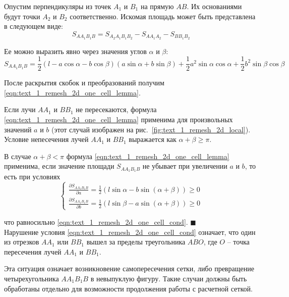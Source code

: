 Опустим перпендикуляры из точек $A_1$ и $B_1$ на прямую $AB$.
Их основаниями будут точки $A_2$ и $B_2$ соответственно.
Искомая площадь может быть представлена в следующем виде:
\begin{equation}
S_{AA_1B_1B} = S_{A_2A_1B_1B_2} - S_{AA_1A_2} - S_{BB_1B_2}
\end{equation}

Ее можно выразить явно через значения углов $\alpha$ и $\beta$:
\begin{equation}
S_{AA_1B_1B} = \frac{1}{2}(l - a \cos \alpha - b \cos \beta)(a \sin \alpha + b \sin \beta) + \frac{1}{2}a^2 \sin \alpha \cos \alpha + \frac{1}{2}b^2 \sin \beta \cos \beta
\end{equation}

После раскрытия скобок и преобразований получим \eqref{eqn:text_1_remesh_2d_one_cell_lemma}.

Если лучи $AA_1$ и $BB_1$ не пересекаются, формула \eqref{eqn:text_1_remesh_2d_one_cell_lemma} применима для произвольных значений $a$ и $b$ (этот случай изображен на рис.~\ref{fig:text_1_remesh_2d_local}).
Условие непесечения лучей $AA_1$ и $BB_1$ выражается как $\alpha + \beta \ge \pi$.

В случае $\alpha + \beta < \pi$ формула \eqref{eqn:text_1_remesh_2d_one_cell_lemma} применима, если значение площади $S_{AA_1B_1B}$ не убывает при увеличении $a$ и $b$, то есть при условиях
\begin{equation}
	\begin{cases}
		\frac{\partial S_{AA_1B_1B}}{\partial a} = \frac{1}{2}(l \sin \alpha - b \sin (\alpha + \beta)) \ge 0 \\
		\frac{\partial S_{AA_1B_1B}}{\partial b} = \frac{1}{2}(l \sin \beta - a \sin (\alpha + \beta)) \ge 0
	\end{cases}
\end{equation}

что равносильно \eqref{eqn:text_1_remesh_2d_one_cell_cond}.
$\blacksquare$\\

Нарушение условия \eqref{eqn:text_1_remesh_2d_one_cell_cond} означает, что один из отрезков $AA_1$ или $BB_1$ вышел за пределы треугольника $ABO$, где $O$ -- точка пересечения лучей $AA_1$ и $BB_1$.

Эта ситуация означает возникновение самопересечения сетки, либо превращение четырехугольника $AA_1B_1B$ в невыпуклую фигуру.
Такие случаи должны быть обработаны отдельно для возможности продолжения работы с расчетной сеткой.

